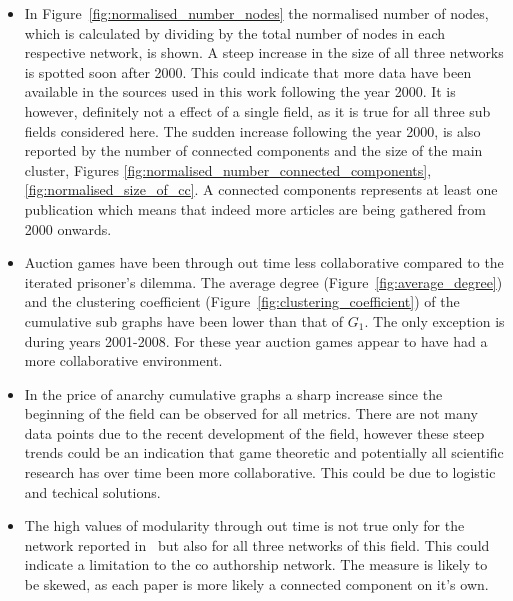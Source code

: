 \documentclass{article}
\theoremstyle{definition}
\begin{document}
\begin{itemize}
    \item In Figure~\ref{fig:normalised_number_nodes} the normalised number of nodes,
    which is calculated by dividing by the total number of nodes in each respective network,
    is shown. A steep increase in the size of all three networks is spotted soon after
    2000. This could indicate that more data have been available in the sources
    used in this work following the year 2000. It is however, definitely not a effect
    of a single field, as it is true for all three sub fields considered here.
    The sudden increase following the year 2000, is also reported by the
    number of connected components and the size of the main cluster, Figures
    \ref{fig:normalised_number_connected_components}, \ref{fig:normalised_size_of_cc}.
    A connected components represents at least one publication which means that indeed
    more articles are being gathered from 2000 onwards.
    \item Auction games have been through out time less collaborative compared
    to the iterated prisoner's dilemma. The average degree (Figure~\ref{fig:average_degree})
    and the clustering coefficient (Figure~\ref{fig:clustering_coefficient}) of 
    the cumulative sub graphs have been lower than that of \(G_1\).
    The only exception is during years 2001-2008. For these
    year auction games appear to have had a more collaborative environment.
    \item In the price of anarchy cumulative graphs a sharp increase since the 
    beginning of the field can be observed for all metrics. There are not
    many data points due to the recent development of the field, however
    these steep trends could be an indication that game theoretic and potentially
    all scientific research has over time been more collaborative. This could
    be due to logistic and techical solutions.
    \item The high values of modularity through out time is not true only for the
    network reported in~\cite{Liu2015} but also for all three networks of this
    field. This could indicate a limitation to the co authorship network. The
    measure is likely to be skewed, as each paper is more likely a connected
    component on it's own.
\end{itemize}
\end{document}
